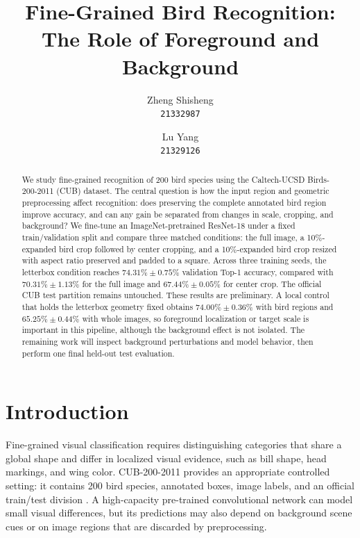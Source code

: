 \documentclass[10pt,twocolumn,letterpaper]{article}
\begin{document}
\title{Fine-Grained Bird Recognition:\\The Role of Foreground and Background}

\author{Zheng Shisheng\\
{\tt\small 21332987}
\and
Lu Yang\\
{\tt\small 21329126}
}

\maketitle

\begin{abstract}
We study fine-grained recognition of 200 bird species using the
Caltech-UCSD Birds-200-2011 (CUB) dataset. The central question is how the
input region and geometric preprocessing affect recognition: does preserving
the complete annotated bird region improve accuracy, and can any gain be
separated from changes in scale, cropping, and background? We fine-tune an
ImageNet-pretrained ResNet-18 under a fixed train/validation split and compare
three matched conditions: the full image, a 10\%-expanded bird crop followed
by center cropping, and a 10\%-expanded bird crop resized with aspect ratio
preserved and padded to a square. Across three training seeds, the letterbox
condition reaches $74.31\% \pm 0.75\%$ validation Top-1 accuracy, compared
with $70.31\% \pm 1.13\%$ for the full image and $67.44\% \pm 0.05\%$ for
center crop. The official CUB test partition remains untouched. These results
are preliminary. A local control that holds the letterbox geometry fixed
obtains $74.00\% \pm 0.36\%$ with bird regions and $65.25\% \pm 0.44\%$ with
whole images, so foreground localization or target scale is important in this
pipeline, although the background effect is not isolated. The remaining work
will inspect background perturbations and model behavior, then perform one
final held-out test evaluation.
\end{abstract}

\section{Introduction}

Fine-grained visual classification requires distinguishing categories that
share a global shape and differ in localized visual evidence, such as bill
shape, head markings, and wing color. CUB-200-2011 provides an appropriate
controlled setting: it contains 200 bird species, annotated boxes, image labels,
and an official train/test division \cite{wah2011cub}. A high-capacity
pre-trained convolutional network can model small visual differences, but its
predictions may also depend on background scene cues or on image regions that
are discarded by preprocessing.
\end{document}
